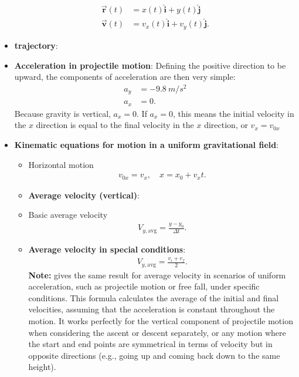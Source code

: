 \documentclass{report}
\begin{document}
\begin{itemize}
            \begin{align*}
                \vec{\mathbf{r}}(t) &= x(t)\hat{\mathbf{i}} + y(t)\hat{\mathbf{j}}\\
                \vec{\mathbf{v}}(t)&= v_{x}(t)\hat{\mathbf{i}} + v_{y}(t)\hat{\mathbf{j}}
            .\end{align*}
        \item \textbf{trajectory}:
        \item \textbf{Acceleration in projectile motion}: Defining the positive direction to be upward, the components of acceleration are then very simple:
            \begin{align*}
                a_{y} &= -9.8\ m/s^{2} \\
                a_{x} &= 0
            .\end{align*}
             Because gravity is vertical, $a_{x} = 0$. If  $a_{x} = 0$, this means the initial velocity in the $x$ direction is equal to the final velocity in the $x$ direction, or  $v_{x} = v_{0x} $
            \item \textbf{Kinematic equations for motion in a uniform gravitational field}:
                \begin{itemize}
                    \item Horizontal motion 
                        \begin{align*}
                            v_{0x} = v_{x}, \quad x = x_{0} +v_{x}t
                        .\end{align*}
                    \item \textbf{Average velocity (vertical)}:
                    \item Basic average velocity 
                        \begin{align*}
                            V_{y,\text{avg}} = \frac{y-y_{0}}{\Delta t}
                        .\end{align*}
                    \item \textbf{Average velocity in special conditions}:
                        \begin{align*}
                            V_{y,\text{avg}} = \frac{v_i +v_f}{2}
                        .\end{align*}
                        \textbf{Note:} gives the same result for average velocity in scenarios of uniform acceleration, such as projectile motion or free fall, under specific conditions. This formula calculates the average of the initial and final velocities, assuming that the acceleration is constant throughout the motion. It works perfectly for the vertical component of projectile motion when considering the ascent or descent separately, or any motion where the start and end points are symmetrical in terms of velocity but in opposite directions (e.g., going up and coming back down to the same height).

\end{itemize}
\end{itemize}
\end{document}
